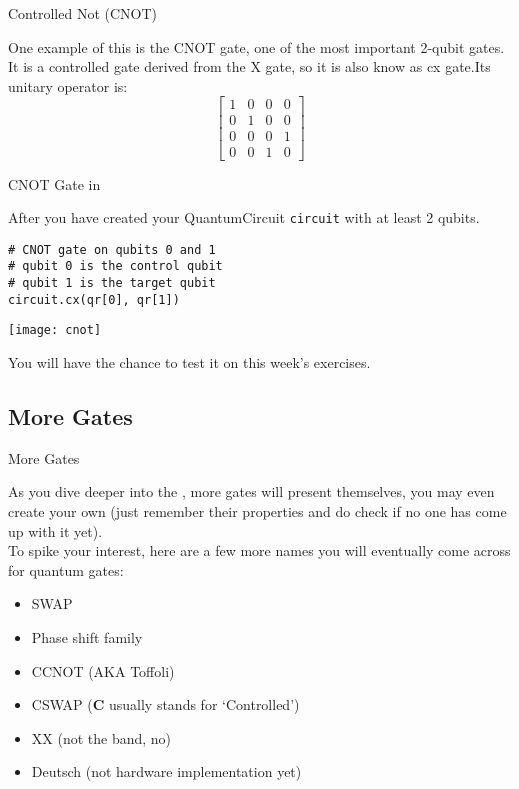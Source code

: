 \documentclass[aspectratio=43]{beamer}
\begin{document}
\begin{frame}{Controlled Not (CNOT)}
\begin{card}
    One example of this is the CNOT gate, one of the most important 2-qubit gates. It is a controlled gate derived from the X gate, so it is also know as cx gate.Its unitary operator is:
    \begin{equation*}
        \begin{bmatrix}1 & 0 & 0 & 0\\ 0 & 1 & 0 & 0\\ 0 & 0 & 0 & 1\\ 0 & 0 & 1 & 0\end{bmatrix}
    \end{equation*}
\end{card}
\pagenumber
\end{frame}

\begin{frame}[fragile]{CNOT Gate in \qk}
\begin{card}
    After you have created your QuantumCircuit \texttt{circuit} with at least 2 qubits. 
    \begin{verbatim}
# CNOT gate on qubits 0 and 1
# qubit 0 is the control qubit
# qubit 1 is the target qubit
circuit.cx(qr[0], qr[1])
    \end{verbatim}
    \begin{center}
        \texttt{[image: cnot]} 
    \end{center}
    You will have the chance to test it on this week's exercises.
\end{card}
\end{frame}


\subsection{More Gates} %
\begin{frame}{More Gates}
\begin{cardTiny}
    As you dive deeper into the \qw, more gates will present themselves, you may even create your own (just remember their properties and do check if no one has come up with it yet).\\
    To spike your interest, here are a few more names you will eventually come across for quantum gates:
    \begin{itemize}
        \item SWAP
        \item Phase shift family
        \item CCNOT (AKA Toffoli)
        \item CSWAP (\textbf{C} usually stands for `Controlled')
        \item XX (not the band, no)
        \item Deutsch (not hardware implementation yet)
    \end{itemize}
\end{cardTiny}
\pagenumber
\end{frame}
\end{document}
